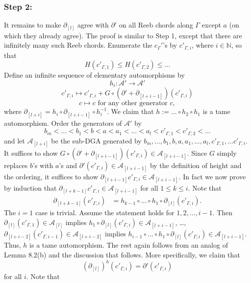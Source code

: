 \documentclass[11pt]{amsart}
\theoremstyle{mystyle}
\newcommand{\<}{\langle}
\renewcommand{\>}{\rangle}
\begin{document}
\subsubsection*{Step 2:}  It remains to make $\partial_{[l]}$ agree with $\partial'$ on all Reeb chords along $\Gamma$ except $a$ (on which they already agree). The proof is similar to Step 1, except that there are infinitely many such Reeb chords. Enumerate the $c_\Gamma'$'s by $c'_{\Gamma, i}$, where $i \in \mathbb{N}$, so that \[H(c'_{\Gamma, 1}) \leq H(c'_{\Gamma, 2}) \leq \dots\] Define an infinite sequence of elementary automorphisms by \[h_i: \mathcal{A}' \rightarrow \mathcal{A}'\] \[c'_{\Gamma, i} \mapsto c'_{\Gamma, i} + G \circ (\partial' + \partial_{[l+i-1]})(c'_{\Gamma, i})\] \[c \mapsto c \text{ for any other generator $c$},\] where $\partial_{[l+i]} = h_{i} \circ \partial_{[l+i-1]} \circ h_{i}^{-1}$. We claim that $h := \dots \circ h_2 \circ h_1$ is a tame automorphism. Order the generators of $\mathcal{A}'$ by \[b_m < \dots < b_1 < b < a < a_1 < \dots < a_l < c'_{\Gamma, 1} < c'_{\Gamma, 2} < \dots\] and let $\mathcal{A}_{[l+i]}$ be the sub-DGA generated by $b_m, \dots, b_1, b, a, a_1, \dots, a_l, c'_{\Gamma, 1}, \dots c'_{\Gamma, i}$. It suffices to show $G \circ (\partial' + \partial_{[l+i-1]})(c'_{\Gamma, i}) \in \mathcal{A}_{[l+i-1]}$. Since $G$ simply replaces $b$'s with $a$'s and $\partial'(c'_{\Gamma, i}) \in \mathcal{A}_{[l+i-1]}$ by the definition of height and the ordering, it suffices to show $\partial_{[l+i-1]} c'_{\Gamma, i} \in \mathcal{A}_{[l+i-1]}$. In fact we now prove by induction that $\partial_{[l+k-1]} c'_{\Gamma, i} \in \mathcal{A}_{[l+i-1]}$ for all $1 \leq k \leq i$. Note that \begin{align*}
    \partial_{[l+k-1]}(c'_{\Gamma, i}) &= h_{k-1} \circ \dots \circ h_1 \circ \partial_{[l]}(c'_{\Gamma, i}).
\end{align*} The $i = 1$ case is trivial. Assume the statement holds for $1, 2, \dots, i-1$. Then $\partial_{[l]}(c'_{\Gamma, 1}) \in \mathcal{A}_{[l]}$ implies $h_1 \circ \partial_{[l]}(c'_{\Gamma, i}) \in \mathcal{A}_{[l+i-1]}$, \dots, $\partial_{[l+i-2]}(c'_{\Gamma, i-1}) \in \mathcal{A}_{[l+i-2]}$ implies $h_{i-1} \circ \dots \circ h_1 \circ \partial_{[l]}(c'_{\Gamma, i}) \in \mathcal{A}_{[l+i-1]}$.  Thus, $h$ is a tame automorphism. The rest again follows from an analog of Lemma 8.2(b) and the discussion that follows. More specifically, we claim that \[(\partial_{[l]})^h(c'_{\Gamma, i}) = \partial'(c'_{\Gamma, i})\] for all $i$. Note that \begin{align*}

\end{align*}
\end{document}
